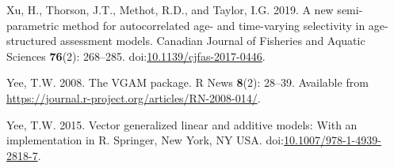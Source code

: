\begin{CSLReferences}{1}{0}
Xu, H., Thorson, J.T., Methot, R.D., and Taylor, I.G. 2019. A new
semi-parametric method for autocorrelated age- and time-varying
selectivity in age-structured assessment models. Canadian Journal of
Fisheries and Aquatic Sciences \textbf{76}(2): 268--285.
doi:\href{https://doi.org/10.1139/cjfas-2017-0446}{10.1139/cjfas-2017-0446}.

Yee, T.W. 2008. The {VGAM} package. R News \textbf{8}(2): 28--39.
Available from
\url{https://journal.r-project.org/articles/RN-2008-014/}.

Yee, T.W. 2015. Vector generalized linear and additive models: With an
implementation in {R}. Springer, New York, NY USA.
doi:\href{https://doi.org/10.1007/978-1-4939-2818-7}{10.1007/978-1-4939-2818-7}.

\end{CSLReferences}
